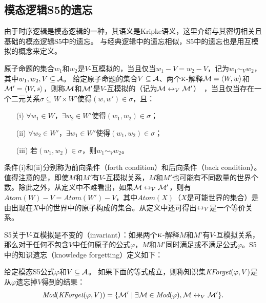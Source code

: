 \subsection{模态逻辑S5的遗忘}\label{chapter:sub:s5forgetting}

由于时序逻辑是模态逻辑的一种，其语义是Kripke语义，这里介绍与其密切相关且基础的模态逻辑S5中的遗忘。
与经典逻辑中的遗忘相似，S5中的遗忘也是用互模拟的概念来定义。

原子命题的集合$w_1$和$w_2$是$V$-互模拟的，当且仅当$w_1 -V = w_2 -V$，记为$w_1 \sim_V w_2$，其中$w_1, w_2, V \subseteq {\cal A}$。
给定原子命题的集合$V\subseteq {\cal A}$、两个$\textsc{k}$-解释${\cal M}={\langle{W,w}\rangle}$和${\cal M}'={\langle{W,s}\rangle}$，则称${\cal M}$和${\cal M}'$是$V$-互模拟的（记为${\cal M} \leftrightarrow_{V} {\cal M}'$）~\cite{Zhang2008Properties}，当且仅当存在一个二元关系$\sigma \subseteq W \times W'$使得$(w,w') \in \sigma$，且：
\begin{itemize}
	\item[(i)] $\forall w_1 \in W$，$\exists w_2\in W'$使得$(w_1, w_2) \in \sigma$；
	\item[(ii)] $\forall w_2 \in W'$，$\exists w_1\in W'$使得$(w_1, w_2) \in \sigma$；
	\item[(iii)] 若$(w_1, w_2) \in \sigma$，则$w_1\sim_V w_2$。
\end{itemize}

条件(i)和(ii)分别称为前向条件（forth condition）和后向条件（back condition）。值得注意的是，即使$M$和$M'$有$V$-互模拟关系，$M$和$M'$也可能有不同数量的世界个数。除此之外，从定义中不难看出，如果${\cal M} \leftrightarrow_{V} {\cal M}'$，则有$Atom(W)-V=Atom(W' )-V$，其中$Atom(X)$（$X$是可能世界的集合）是由出现在$X$中的世界中的原子构成的集合。从定义中还可得出$\leftrightarrow_V$是一个等价关系。

S5关于$V$-互模拟是不变的（invariant）：如果两个$\textsc{k}$-解释$M$和$M'$有$V$-互模拟关系，那么对于任何不包含$V$中任何原子的公式$\varphi$，$M$和$M'$同时满足或不满足公式$\varphi$。S5中的知识遗忘（knowledge forgetting）定义如下\cite{Zhang2008Properties}：

\begin{definition}\label{def:s5forgetting}
	给定模态S5公式$\varphi$和$V\subseteq {\cal A}$。
	如果下面的等式成立，则称知识集$\textit{KForget}(\varphi,V)$是从$\varphi$遗忘掉$V$得到的结果：
	$$\textit{Mod}(\textit{KForget}(\varphi, V)) = \{{\cal M}' \mid \exists {\cal M} \in \textit{Mod}(\varphi), {\cal M} \leftrightarrow_V {\cal M}'\}.$$
\end{definition}

